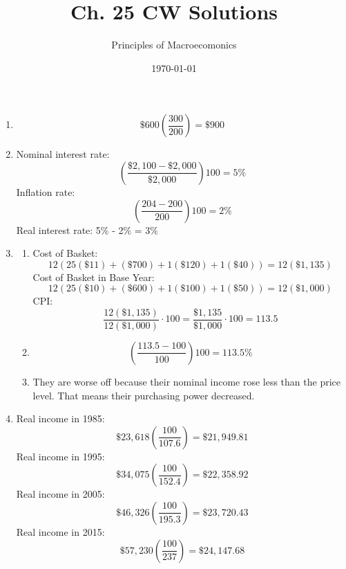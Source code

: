 \documentclass{article}
\title{Ch. 25 CW Solutions}
\author{Principles of Macroecomonics}
\date{\today}
\begin{document}
\maketitle

\begin{enumerate}

\item
	\[ \$600 \left( \frac{300}{200} \right) = \$900 \]
	
\item Nominal interest rate: \[ \left( \frac{\$2,100 - \$2,000}{\$2,000} \right) 100 = 5\% \]
	Inflation rate: \[ \left( \frac{204 - 200}{200} \right) 100 = 2\% \]
	Real interest rate: 5\% - 2\% = 3\%

\item 

	\begin{enumerate}
	
	\item Cost of Basket:
		\begin{equation*}
		12(25(\$11) + (\$700) + 1(\$120) + 1(\$40)) = 12(\$1,135)
		\end{equation*}
		Cost of Basket in Base Year: 
		\begin{equation*}
		12(25(\$10) + (\$600) + 1(\$100) + 1(\$50)) = 12(\$1,000)
		\end{equation*}
		CPI:
		\begin{equation*}
		 \frac{12(\$1,135)}{12(\$1,000)} \cdot 100 = \frac{\$1,135}{\$1,000} \cdot 100 = 113.5
		\end{equation*}
		
	\item \begin{equation*}
		\left( \frac{113.5 - 100}{100} \right)100 = 113.5\%
		\end{equation*}
		
	\item They are worse off because their nominal income rose less than the price level. That means their purchasing power decreased.
		
	\end{enumerate}
	
\item Real income in 1985:
	\begin{equation*}
	\$23,618 \left( \frac{100}{107.6} \right) = \$21,949.81
	\end{equation*}
	Real income in 1995:
	\begin{equation*}
	\$34,075 \left( \frac{100}{152.4} \right) = \$22,358.92
	\end{equation*}
	Real income in 2005:
	\begin{equation*}
	\$46,326 \left( \frac{100}{195.3} \right) = \$23,720.43
	\end{equation*}
	Real income in 2015:
	\begin{equation*}
	\$57,230 \left( \frac{100}{237} \right) = \$24,147.68
	\end{equation*}
	

\end{enumerate}
\end{document}
